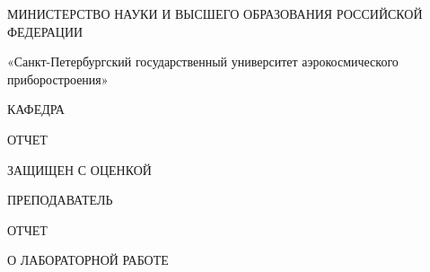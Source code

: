 

\thispagestyle{empty}

\begingroup
\fontsize{12}{14.4}\selectfont


\begin{center}
МИНИСТЕРСТВО НАУКИ И ВЫСШЕГО ОБРАЗОВАНИЯ РОССИЙСКОЙ ФЕДЕРАЦИИ
	
\vspace{0.5ex}
	
	
«Санкт-Петербургский государственный университет аэрокосмического приборостроения»
	
\vspace{0.9cm}
	
КАФЕДРА \MakeUppercase{\setUniversityDepartment}
\end{center} 

\vspace{1.2cm}

\begin{flushleft}
ОТЧЕТ
	
ЗАЩИЩЕН С ОЦЕНКОЙ
	
ПРЕПОДАВАТЕЛЬ
\end{flushleft}

\noindent {}

\vspace{1.2cm}

\begin{center}
{\fontsize{14}{18}\selectfont
ОТЧЕТ
		
О ЛАБОРАТОРНОЙ РАБОТЕ \setWorkNumber
}
	
\vspace{12mm}
	
{\fontsize{14}{18}\selectfont \MakeUppercase{\setWorkName}}
\end{center}

